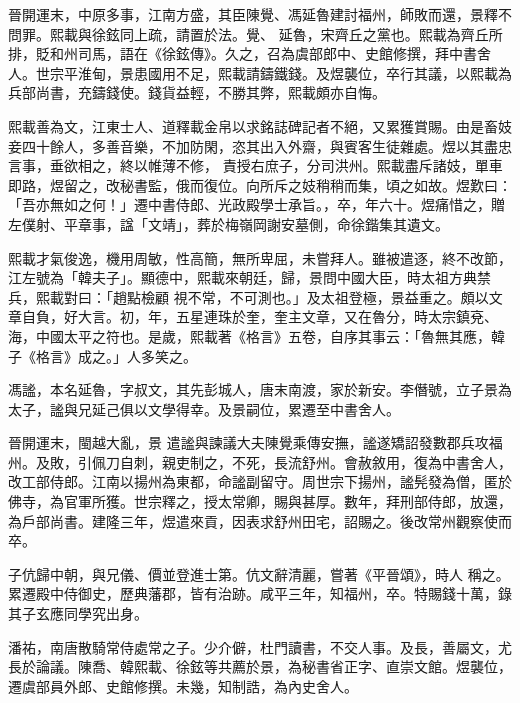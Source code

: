 \begin{pinyinscope}
 晉開運末，中原多事，江南方盛，其臣陳覺、馮延魯建討福州，師敗而還，景釋不問罪。熙載與徐鉉同上疏，請置於法。覺、
 延魯，宋齊丘之黨也。熙載為齊丘所排，貶和州司馬，語在《徐鉉傳》。久之，召為虞部郎中、史館修撰，拜中書舍人。世宗平淮甸，景患國用不足，熙載請鑄鐵錢。及煜襲位，卒行其議，以熙載為兵部尚書，充鑄錢使。錢貨益輕，不勝其弊，熙載頗亦自悔。



 熙載善為文，江東士人、道釋載金帛以求銘誌碑記者不絕，又累獲賞賜。由是畜妓妾四十餘人，多善音樂，不加防閑，恣其出入外齋，與賓客生徒雜處。煜以其盡忠言事，垂欲相之，終以帷薄不修，
 責授右庶子，分司洪州。熙載盡斥諸妓，單車即路，煜留之，改秘書監，俄而復位。向所斥之妓稍稍而集，頃之如故。煜歎曰：「吾亦無如之何！」遷中書侍郎、光政殿學士承旨。，卒，年六十。煜痛惜之，贈左僕射、平章事，諡「文靖」，葬於梅嶺岡謝安墓側，命徐鍇集其遺文。



 熙載才氣俊逸，機用周敏，性高簡，無所卑屈，未嘗拜人。雖被遣逐，終不改節，江左號為「韓夫子」。顯德中，熙載來朝廷，歸，景問中國大臣，時太祖方典禁兵，熙載對曰：「趙點檢顧
 視不常，不可測也。」及太祖登極，景益重之。頗以文章自負，好大言。初，年，五星連珠於奎，奎主文章，又在魯分，時太宗鎮兗、海，中國太平之符也。是歲，熙載著《格言》五卷，自序其事云：「魯無其應，韓子《格言》成之。」人多笑之。



 馮謐，本名延魯，字叔文，其先彭城人，唐末南渡，家於新安。李僭號，立子景為太子，謐與兄延己俱以文學得幸。及景嗣位，累遷至中書舍人。



 晉開運末，閩越大亂，景
 遣謐與諫議大夫陳覺乘傳安撫，謐遂矯詔發數郡兵攻福州。及敗，引佩刀自刺，親吏制之，不死，長流舒州。會赦敘用，復為中書舍人，改工部侍郎。江南以揚州為東都，命謐副留守。周世宗下揚州，謐髡發為僧，匿於佛寺，為官軍所獲。世宗釋之，授太常卿，賜與甚厚。數年，拜刑部侍郎，放還，為戶部尚書。建隆三年，煜遣來貢，因表求舒州田宅，詔賜之。後改常州觀察使而卒。



 子伉歸中朝，與兄儀、價並登進士第。伉文辭清麗，嘗著《平晉頌》，時人
 稱之。累遷殿中侍御史，歷典藩郡，皆有治跡。咸平三年，知福州，卒。特賜錢十萬，錄其子玄應同學究出身。



 潘祐，南唐散騎常侍處常之子。少介僻，杜門讀書，不交人事。及長，善屬文，尤長於論議。陳喬、韓熙載、徐鉉等共薦於景，為秘書省正字、直崇文館。煜襲位，遷虞部員外郎、史館修撰。未幾，知制誥，為內史舍人。




\end{pinyinscope}
